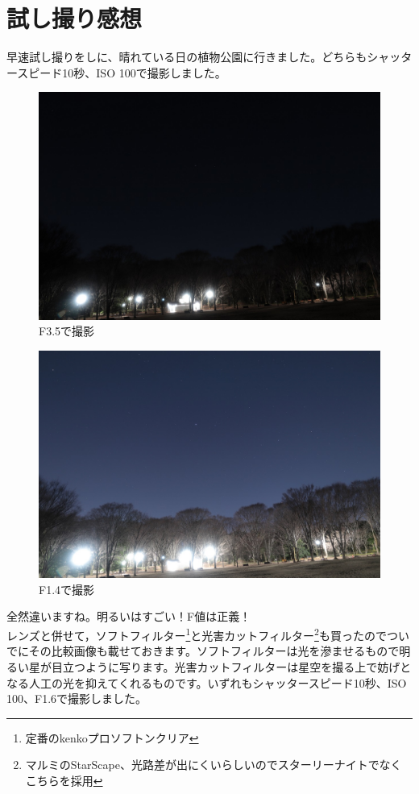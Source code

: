 \documentclass[../../super_nova_2023]{subfiles}
\begin{document}
\section{試し撮り感想}
早速試し撮りをしに、晴れている日の植物公園に行きました。どちらもシャッタースピード10秒、ISO 100で撮影しました。
\begin{figure}[H]
	\begin{center}
		\includegraphics[width=12cm]{figures/Maruyama/kurai.jpg}
		\caption{F3.5で撮影}
	\end{center}
\end{figure}
\begin{figure}[H]
	\begin{center}
		\includegraphics[width=12cm]{figures/Maruyama/akarui.jpg}
		\caption{F1.4で撮影}
	\end{center}
\end{figure}
全然違いますね。明るいはすごい！F値は正義！\\
レンズと併せて，ソフトフィルター\footnote{定番のkenkoプロソフトンクリア}と光害カットフィルター\footnote{マルミのStarScape、光路差が出にくいらしいのでスターリーナイトでなくこちらを採用}も買ったのでついでにその比較画像も載せておきます。ソフトフィルターは光を滲ませるもので明るい星が目立つように写ります。光害カットフィルターは星空を撮る上で妨げとなる人工の光を抑えてくれるものです。いずれもシャッタースピード10秒、ISO 100、F1.6で撮影しました。
\end{document}
